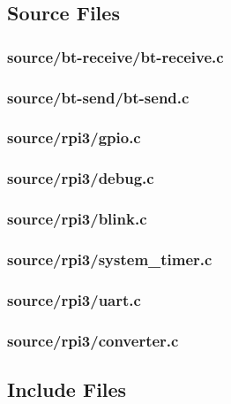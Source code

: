 \subsection{Source Files}


\subsubsection*{source/bt-receive/bt-receive.c}


\subsubsection*{source/bt-send/bt-send.c}


\subsubsection*{source/rpi3/gpio.c}


\subsubsection*{source/rpi3/debug.c}


\subsubsection*{source/rpi3/blink.c}


\subsubsection*{source/rpi3/system\_timer.c}


\subsubsection*{source/rpi3/uart.c}


\subsubsection*{source/rpi3/converter.c}




\subsection{Include Files}


